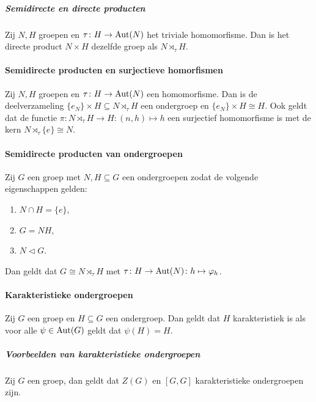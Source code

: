 \subparagraph{Semidirecte en directe producten} Zij \(N,H\) groepen en \(\tau\colon H\to\operatorname{Aut}(N)\) het triviale homomorfisme. Dan is het directe product \(N\times H\) dezelfde groep als \(N\rtimes_{\tau} H\).

\paragraph{Semidirecte producten en surjectieve homorfismen} Zij \(N,H\) groepen en \(\tau\colon H\to\operatorname{Aut}(N)\) een homomorfisme. Dan is de deelverzameling \(\{e_{N}\}\times H\subseteq N\rtimes_{\tau}H\) een ondergroep en \(\{e_{N}\}\times H\cong H\). Ook geldt dat de functie \(\pi\colon N\rtimes_{\tau}H\to H\colon (n,h)\mapsto h\) een surjectief homomorfisme is met de kern \(N\rtimes_{\tau}\{e\}\cong N\).

\paragraph{Semidirecte producten van ondergroepen} Zij \(G\) een groep met \(N,H\subseteq G\) een ondergroepen zodat de volgende eigenschappen gelden:
\begin{enumerate}
    \item \(N\cap H=\{e\}\),
    \item \(G=NH\),
    \item \(N\triangleleft G\).
\end{enumerate}
Dan geldt dat \(G\cong N\rtimes_{\tau}H\) met \(\tau\colon H\to\operatorname{Aut}(N)\colon h\mapsto\varphi_{h}\).

\paragraph{Karakteristieke ondergroepen} Zij \(G\) een groep en \(H\subseteq G\) een ondergroep. Dan geldt dat \(H\) karakteristiek is als voor alle \(\psi\in\operatorname{Aut}(G)\) geldt dat \(\psi(H)=H\).

\subparagraph{Voorbeelden van karakteristieke ondergroepen} Zij \(G\) een groep, dan geldt dat \(Z(G)\) en \([G,G]\) karakteristieke ondergroepen zijn.